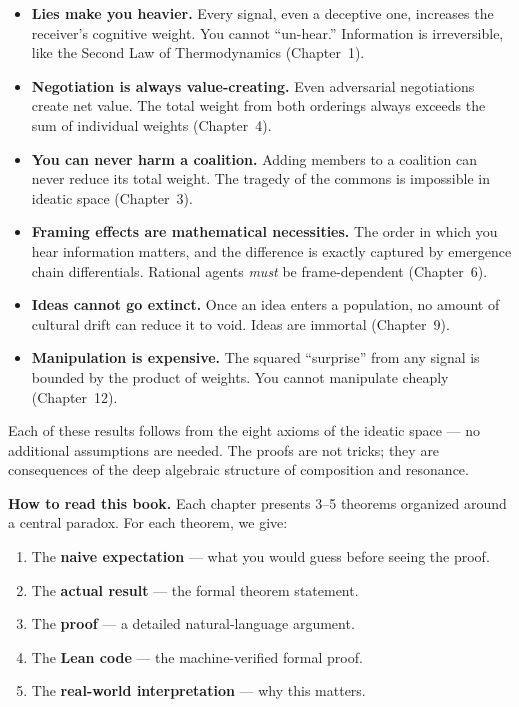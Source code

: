 \documentclass[11pt,openany]{book}
\theoremstyle{definition}
\theoremstyle{plain}
\theoremstyle{remark}
\begin{document}
\begin{itemize}
\item \textbf{Lies make you heavier.} Every signal, even a deceptive one, increases the receiver's cognitive weight. You cannot ``un-hear.'' Information is irreversible, like the Second Law of Thermodynamics (Chapter~1).

\item \textbf{Negotiation is always value-creating.} Even adversarial negotiations create net value. The total weight from both orderings always exceeds the sum of individual weights (Chapter~4).

\item \textbf{You can never harm a coalition.} Adding members to a coalition can never reduce its total weight. The tragedy of the commons is impossible in ideatic space (Chapter~3).

\item \textbf{Framing effects are mathematical necessities.} The order in which you hear information matters, and the difference is exactly captured by emergence chain differentials. Rational agents \emph{must} be frame-dependent (Chapter~6).

\item \textbf{Ideas cannot go extinct.} Once an idea enters a population, no amount of cultural drift can reduce it to void. Ideas are immortal (Chapter~9).

\item \textbf{Manipulation is expensive.} The squared ``surprise'' from any signal is bounded by the product of weights. You cannot manipulate cheaply (Chapter~12).
\end{itemize}

Each of these results follows from the eight axioms of the ideatic space --- no additional assumptions are needed. The proofs are not tricks; they are consequences of the deep algebraic structure of composition and resonance.

\bigskip

\noindent\textbf{How to read this book.} Each chapter presents 3--5 theorems organized around a central paradox. For each theorem, we give:
\begin{enumerate}
\item The \textbf{naive expectation} --- what you would guess before seeing the proof.
\item The \textbf{actual result} --- the formal theorem statement.
\item The \textbf{proof} --- a detailed natural-language argument.
\item The \textbf{Lean code} --- the machine-verified formal proof.
\item The \textbf{real-world interpretation} --- why this matters.
\end{enumerate}
\end{document}

